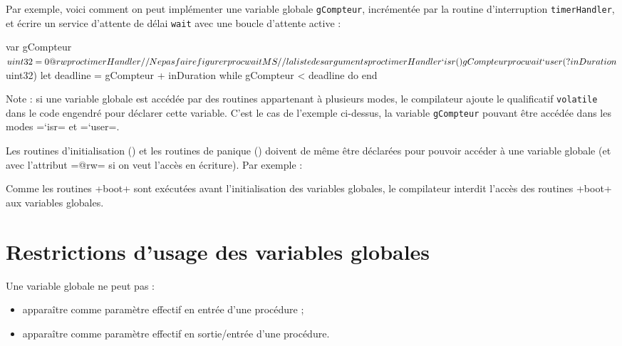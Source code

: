 Par exemple, voici comment on peut implémenter une variable globale \texttt{gCompteur}, incrémentée par la routine d'interruption \texttt{timerHandler}, et écrire un service d'attente de délai \texttt{wait} avec une boucle d'attente active :

\begin{PLM}
var gCompteur $uint32 = 0 {
  @rw proc timerHandler // Ne pas faire figurer
  proc waitMS           // la liste des arguments
}

proc timerHandler `isr () {
  gCompteur %
}

proc wait `user (?inDuration $uint32) {
  let deadline = gCompteur + inDuration
  while gCompteur < deadline do
  end
}
\end{PLM}

Note : si une variable globale est accédée par des routines appartenant à plusieurs modes, le compilateur ajoute le qualificatif \texttt{volatile} dans le code engendré pour déclarer cette variable. C'est le cas de l'exemple ci-dessus, la variable \texttt{gCompteur} pouvant être accédée dans les modes \plm=`isr= et \plm=`user=.


Les routines d'initialisation () et les routines de panique ()
 doivent de même être déclarées pour pouvoir accéder à une variable globale (et avec l'attribut \plm=@rw= si on veut l'accès en écriture). Par exemple :

Comme les routines \plm+boot+ sont exécutées avant l'initialisation des variables globales, le compilateur interdit l'accès des routines \plm+boot+ aux variables globales.

\section{Restrictions d'usage des variables globales}

Une variable globale ne peut pas :
\begin{itemize}
  \item apparaître comme paramètre effectif en entrée d'une procédure ;
  \item apparaître comme paramètre effectif en sortie/entrée d'une procédure.
\end{itemize}

